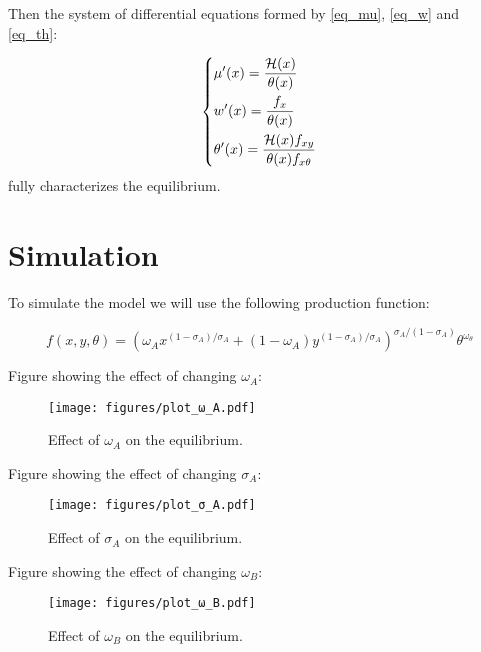 \documentclass[12pt]{article}
\theoremstyle{definition}
\begin{document}
Then the system of differential equations formed by \eqref{eq_mu}, \eqref{eq_w} and \eqref{eq_th}:

\begin{equation}
\begin{dcases}
        \mu'(x) = \frac{\mathcal{H}(x)}{\theta(x)} \\
        w^{\prime}(x) =\frac{f_{x}}{\theta(x)}   \\
        \theta'(x) = \frac{\mathcal{H}(x)f_{x y}}{\theta(x) f_{x \theta}}
\end{dcases}
\end{equation}
fully characterizes the equilibrium.


\section{Simulation}
To simulate the model we will use the following production function:

\begin{equation}\label{prod_funct}
    f(x,y,\theta) = \left(\omega_{A} x^{\left(1-\sigma_{A}\right) / \sigma_{A}}+\left(1-\omega_{A}\right) y^{\left(1-\sigma_{A}\right) / \sigma_{A}}\right)^{\sigma_{A} /\left(1-\sigma_{A}\right)} \theta^{\omega_{\theta}}
\end{equation}

Figure showing the effect of changing $\omega_A$:

\begin{figure}[h]
    \begin{center}
        \texttt{[image: figures/plot\_ω\_A.pdf]}
        \caption{Effect of $\omega_A$ on the equilibrium.}
        \label{fig:sim_omega_A}
    \end{center}
\end{figure}

Figure showing the effect of changing $\sigma_A$:

\begin{figure}[h]
    \begin{center}
        \texttt{[image: figures/plot\_σ\_A.pdf]}
        \caption{Effect of $\sigma_A$ on the equilibrium.}
        \label{fig:sim_σ_A}
    \end{center}
\end{figure}

Figure showing the effect of changing $\omega_B$:

\begin{figure}[h]
    \begin{center}
        \texttt{[image: figures/plot\_ω\_B.pdf]}
        \caption{Effect of $\omega_B$ on the equilibrium.}
        \label{fig:sim_omega_B}
    \end{center}
\end{figure}


\end{document}
